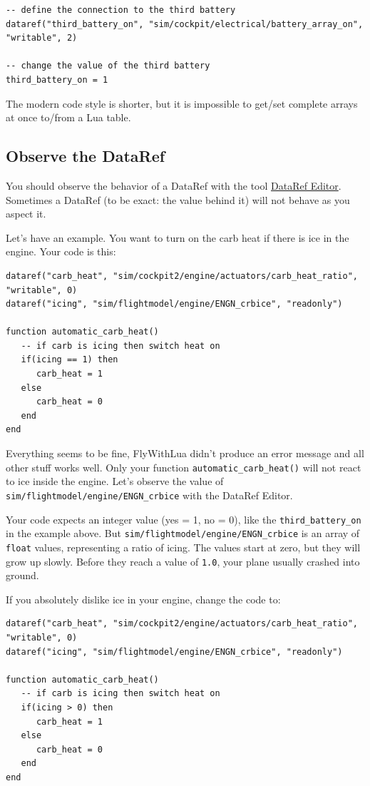 \documentclass[11pt,parskip=half,a4paper]{scrartcl}
\begin{document}
\begin{lstlisting}
-- define the connection to the third battery
dataref("third_battery_on", "sim/cockpit/electrical/battery_array_on", "writable", 2)

-- change the value of the third battery
third_battery_on = 1
\end{lstlisting}

The modern code style is shorter, but it is impossible to get/set complete arrays at once to/from a Lua table.

\subsection{Observe the DataRef}

You should observe the behavior of a DataRef with the tool \href{http://wiki.x-plane.com/DataRefEditor}{DataRef Editor}. Sometimes a DataRef (to be exact: the value behind it) will not behave as you aspect it.

Let's have an example. You want to turn on the carb heat if there is ice in the engine. Your code is this:

\begin{lstlisting}
dataref("carb_heat", "sim/cockpit2/engine/actuators/carb_heat_ratio", "writable", 0)
dataref("icing", "sim/flightmodel/engine/ENGN_crbice", "readonly")

function automatic_carb_heat()
   -- if carb is icing then switch heat on 
   if(icing == 1) then
      carb_heat = 1
   else
      carb_heat = 0
   end	
end
\end{lstlisting}

Everything seems to be fine, FlyWithLua didn't produce an error message and all other stuff works well. Only your function \verb|automatic_carb_heat()| will not react to ice inside the engine. Let's observe the value of \verb|sim/flightmodel/engine/ENGN_crbice| with the DataRef Editor.

Your code expects an integer value (yes = 1, no = 0), like the \verb|third_battery_on| in the example above. But \verb|sim/flightmodel/engine/ENGN_crbice| is an array of \verb|float| values, representing a ratio of icing. The values start at zero, but they will grow up slowly. Before they reach a value of \verb|1.0|, your plane usually crashed into ground.

If you absolutely dislike ice in your engine, change the code to:

\begin{lstlisting}
dataref("carb_heat", "sim/cockpit2/engine/actuators/carb_heat_ratio", "writable", 0)
dataref("icing", "sim/flightmodel/engine/ENGN_crbice", "readonly")

function automatic_carb_heat()
   -- if carb is icing then switch heat on 
   if(icing > 0) then
      carb_heat = 1
   else
      carb_heat = 0
   end
end
\end{lstlisting}
\end{document}
